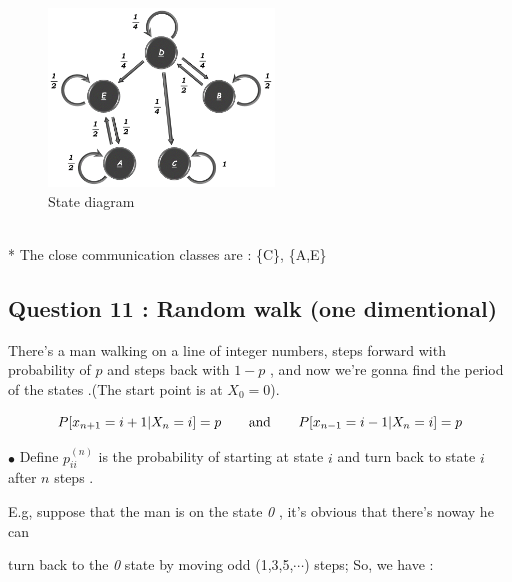 \documentclass[a4paper]{article}
\begin{document}
			\newpage
			
			\begin{figure}[htbp]
				\begin{center}
					\includegraphics[width= 6cm]{img/q10} 
				\end{center}
				\caption{State diagram}
			\end{figure}
		
		\\*
		The close communication classes are : \{C\}, \{A,E\}
	
	\subsection{{\Large Question 11 :} Random walk (one dimentional)}
		There's a man walking on a line of integer numbers, steps forward with probability of $p$ and steps back with $1-p$ , and now we're gonna find the period of the states .(The start point is at $X_0 = 0$).
		
		\[P[x_{n+1} = i+1 | X_n = i] = p \text{\hspace{.6cm} and \hspace{.6cm}} P[x_{n-1} = i-1 | X_n = i] = p\]
		
		$\bullet$ Define $p^{(n)}_{ii}$ is the probability of starting at state $i$ and turn back to state $i$ after $n$ steps .
		
		
		E.g, suppose that the man is on the state \emph{0} , it's obvious that there's noway he can
		
		turn back to the \emph{0} state by moving odd (1,3,5,$\cdots$) steps; So, we have :
		
\end{document}
